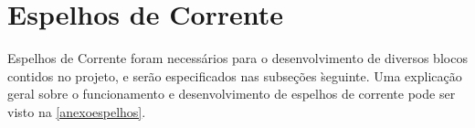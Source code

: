 \section{Espelhos de Corrente}

Espelhos de Corrente foram necess\'arios para o desenvolvimento de diversos blocos contidos no projeto, e ser\~ao especificados nas subse{\c c}\~oes \` seguinte. Uma explica{\c c}\~ao geral sobre o funcionamento e desenvolvimento de espelhos de corrente pode ser visto na \autoref{anexoespelhos}.

\newcommand{\NomeBloco}{NULL}
\newcommand{\NomeBlocoNoUnderline}{NULL}
\newcommand{\NomePTab}{tab_\NomeBlocoNoUnderline}
\newcommand{\NomeSTab}{tab_\NomeBlocoNoUnderline2}
\newcommand{\NomePFig}{fig_\NomeBlocoNoUnderline}
\newcommand{\NomeSFig}{fig_\NomeBlocoNoUnderline2}
\newcommand{\NomeTTab}{tab_\NomeBlocoNoUnderline3}
\newcommand{\NomeQTab}{tab_\NomeBlocoNoUnderline4}



